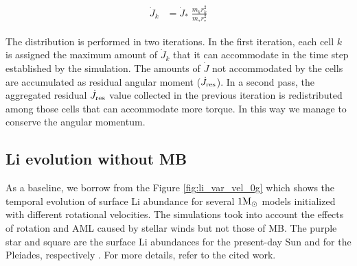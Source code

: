 \documentclass[fleqn,usenatbib]{mnras}
\begin{document}
\begin{ceqn}
\begin{ceqn}
\begin{align}
    \Dot{J}_{k} &= \Dot{J}_*\;\frac{m^{}_{k} r^2_{k}}{m^{}_* r_*^2} \label{eq:k_jdot}
\end{align}
\end{ceqn}

The distribution is performed in two iterations. In the first iteration, each cell $k$ is assigned the maximum amount of $\Dot{J}_{k}$ that it can accommodate in the time step established by the simulation. The amounts of $\Dot{J}$ not accommodated by the cells are accumulated as residual angular moment ($\Dot{J}_{\mathrm{res}}$). In a second pass, the aggregated residual $\Dot{J}_{\mathrm{res}}$ value collected in the previous iteration is redistributed among those cells that can accommodate more torque. In this way we manage to conserve the angular momentum.\par

\subsection{Li evolution without MB}
As a baseline, we borrow from \cite{Navarro2020} the Figure \ref{fig:li_var_vel_0g} which shows the temporal evolution of surface Li abundance for several $1\mathrm{M}_\odot$ models initialized with different rotational velocities. The simulations took into account the effects of rotation and AML caused by stellar winds but not those of MB. The purple star and square are the surface Li abundances for the present-day Sun \citep{Asplund2009} and for the Pleiades, respectively \citep{Sestito2005}. For more details, refer to the cited work.\par


\end{ceqn}
\end{document}

